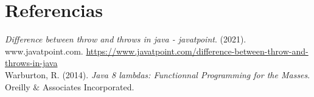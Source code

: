 \documentclass[12pt]{article}
\begin{document}
  \section*{Referencias}
  \textit{Difference between throw and throws in java - javatpoint}. (2021). www.javatpoint.com. \url{https://www.javatpoint.com/difference-between-throw-and-throws-in-java} \\

  Warburton, R. (2014). \textit{Java 8 lambdas: Functionnal Programming for the Masses}. Oreilly $\&$ Associates Incorporated.
\end{document}
